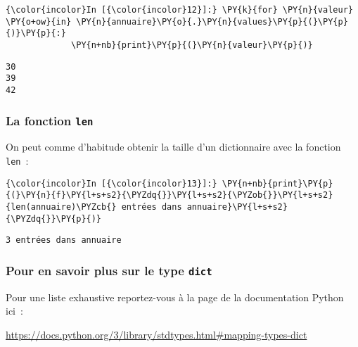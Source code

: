     \begin{Verbatim}[commandchars=\\\{\}]
{\color{incolor}In [{\color{incolor}12}]:} \PY{k}{for} \PY{n}{valeur} \PY{o+ow}{in} \PY{n}{annuaire}\PY{o}{.}\PY{n}{values}\PY{p}{(}\PY{p}{)}\PY{p}{:}
             \PY{n+nb}{print}\PY{p}{(}\PY{n}{valeur}\PY{p}{)}
\end{Verbatim}


    \begin{Verbatim}[commandchars=\\\{\}]
30
39
42

    \end{Verbatim}

    \hypertarget{la-fonction-len}{%
\subsubsection{\texorpdfstring{La fonction
\texttt{len}}{La fonction len}}\label{la-fonction-len}}

    On peut comme d'habitude obtenir la taille d'un dictionnaire avec la
fonction \texttt{len}~:

    \begin{Verbatim}[commandchars=\\\{\}]
{\color{incolor}In [{\color{incolor}13}]:} \PY{n+nb}{print}\PY{p}{(}\PY{n}{f}\PY{l+s+s2}{\PYZdq{}}\PY{l+s+s2}{\PYZob{}}\PY{l+s+s2}{len(annuaire)\PYZcb{} entrées dans annuaire}\PY{l+s+s2}{\PYZdq{}}\PY{p}{)}
\end{Verbatim}


    \begin{Verbatim}[commandchars=\\\{\}]
3 entrées dans annuaire

    \end{Verbatim}

    \hypertarget{pour-en-savoir-plus-sur-le-type-dict}{%
\subsubsection{\texorpdfstring{Pour en savoir plus sur le type
\texttt{dict}}{Pour en savoir plus sur le type dict}}\label{pour-en-savoir-plus-sur-le-type-dict}}

    Pour une liste exhaustive reportez-vous à la page de la documentation
Python ici~:

\href{https://docs.python.org/3/library/stdtypes.html\#mapping-types-dict}{https://docs.python.org/3/library/stdtypes.html\#mapping-types-dict}


